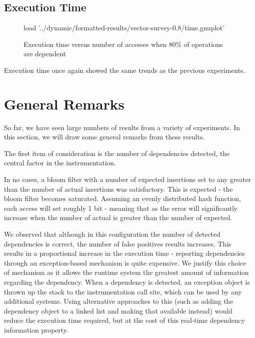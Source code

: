 	\subsection{Execution Time} \label{sec:results/80/time}
	\begin{figure}
		\centering
		\begin{gnuplot}[terminal=pdf]
			load '../dynamic/formatted-results/vector-survey-0.8/time.gnuplot'
		\end{gnuplot}
		\caption{Execution time versus number of accesses when 80\% of operations are dependent}
		\label{chart:80-time}
	\end{figure}
	
	Execution time once again showed the same trends as the previous experiments.

\section{General Remarks} \label{sec:results/general-remarks}
So far, we have seen large numbers of results from a variety of experiments. In this section, we will draw some general remarks from these results.

The first item of consideration is the number of dependencies detected, the central factor in the instrumentation.

In no cases, a bloom filter with a number of expected insertions set to any greater than the number of actual insertions was satisfactory. This is expected - the bloom filter becomes saturated. Assuming an evenly distributed hash function, each access will set roughly 1 bit - meaning that as the error will significantly increase when the number of actual is greater than the number of expected. 

We observed that although in this configuration the number of detected dependencies is correct, the number of false positives results increases. This results in a proportional increase in the execution time - reporting dependencies through an exception-based mechanism is quite expensive. We justify this choice of mechanism as it allows the runtime system the greatest amount of information regarding the dependency. When a dependency is detected, an exception object is thrown up the stack to the instrumentation call site, which can be used by any additional systems. Using alternative approaches to this (such as adding the dependency object to a linked list and making that available instead) would reduce the execution time required, but at the cost of this real-time dependency information property.

